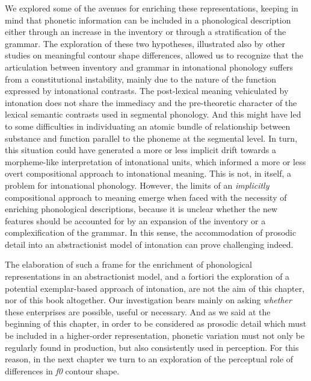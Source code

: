 We explored some of the avenues for enriching these representations, keeping in mind that phonetic information can be included in a phonological description either through an increase in the inventory or through a stratification of the grammar. The exploration of these two hypotheses, illustrated also by other studies on meaningful contour shape differences, allowed us to recognize that the articulation between inventory and grammar in intonational phonology suffers from a constitutional instability, mainly due to the nature of the function expressed by intonational contrasts. The post-lexical meaning vehiculated by intonation does not share the immediacy and the pre-theoretic character of the lexical semantic contrasts used in segmental phonology. And this might have led to some difficulties in individuating an atomic bundle of relationship between substance and function parallel to the phoneme at the segmental level. In turn, this situation could have generated a more or less implicit drift towards a morpheme-like interpretation of intonational units, which informed a more or less overt compositional approach to intonational meaning. This is not, in itself, a problem for intonational phonology. However, the limits of an \textit{implicitly} compositional approach to meaning emerge when faced with the necessity of enriching phonological descriptions, because it is unclear whether the new features should be accounted for by an expansion of the inventory or a complexification of the grammar. In this sense, the accommodation of prosodic detail into an abstractionist model of intonation can prove challenging indeed. 

The elaboration of such a frame for the enrichment of phonological representations in an abstractionist model, and a fortiori the exploration of a potential exemplar-based approach of intonation, are not the aim of this chapter, nor of this book altogether. Our investigation bears mainly on asking \textit{whether} these enterprises are possible, useful or necessary. And as we said at the beginning of this chapter, in order to be considered as prosodic detail which must be included in a higher-order representation, phonetic variation must not only be regularly found in production, but also consistently used in perception. For this reason, in the next chapter we turn to an exploration of the perceptual role of differences in \textit{f0} contour shape.